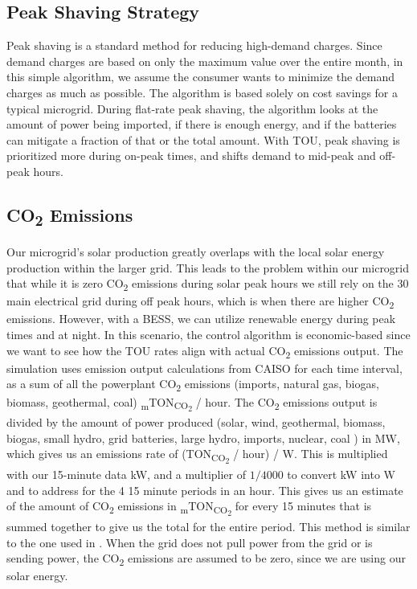 \documentclass[conference]{IEEEtran}
\begin{document}
    \subsection{Peak Shaving Strategy}
       		Peak shaving is a standard method for reducing high-demand charges. Since demand charges are based on only the maximum value over the entire month, in this simple algorithm, we assume the consumer wants to minimize the demand charges as much as possible. The algorithm is based solely on cost savings for a typical microgrid. During flat-rate peak shaving, the algorithm looks at the amount of power being imported, if there is enough energy, and if the batteries can mitigate a fraction of that or the total amount. With TOU, peak shaving is prioritized more during on-peak times, and shifts demand to mid-peak and off-peak hours. 
    \subsection{CO\textsubscript{2} Emissions}
        	Our microgrid's solar production greatly overlaps with the local solar energy production within the larger grid. This leads to the problem within our microgrid that while it is zero CO\textsubscript{2} emissions during solar peak hours we still rely on the 30 main electrical grid during off peak hours, which is when there are higher CO\textsubscript{2} emissions. However, with a BESS, we can utilize renewable energy during peak times and at night. In this scenario, the control algorithm is economic-based since we want to see how  the TOU rates align with actual CO\textsubscript{2} emissions output. The simulation uses emission output calculations from CAISO for each time interval, as a sum of all the powerplant CO\textsubscript{2} emissions (imports, natural gas, biogas, biomass, geothermal, coal) \textsubscript{m}TON\textsubscript{CO\textsubscript{2}} / hour. The CO\textsubscript{2} emissions output is divided by the amount of power produced (solar, wind, geothermal, biomass, biogas, small hydro, grid batteries, large hydro, imports, nuclear, coal ) in MW, which gives us an emissions rate of (TON\textsubscript{CO\textsubscript{2}} / hour) / W. This is multiplied with our 15-minute data kW, and a multiplier of  $1/ 4000$ to convert kW into W and to address for the 4 15 minute periods in an hour.   This gives us an estimate of the amount of CO\textsubscript{2} emissions in \textsubscript{m}TON\textsubscript{CO\textsubscript{2}} for every 15 minutes that is summed together to give us the total for the entire period.  This method is similar to the one used in \cite{garrido2021dynamic}.  When the grid does not pull power from the grid or is sending power, the CO\textsubscript{2} emissions are assumed to be zero, since we are using our solar energy.
\end{document}
